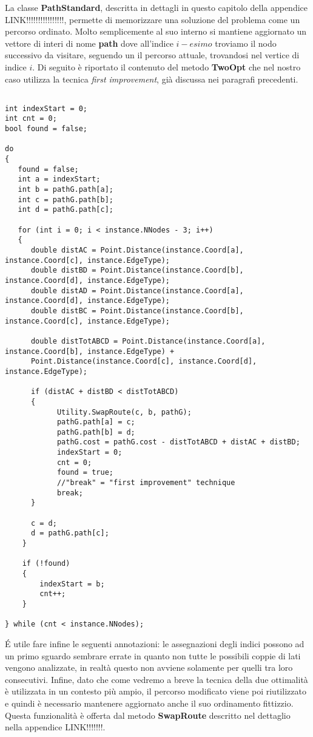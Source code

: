 \documentclass[11pt]{article}
\begin{document}
La classe \textbf{PathStandard}, descritta in dettagli in questo capitolo della appendice LINK!!!!!!!!!!!!!!!!, permette di memorizzare una soluzione del problema come un percorso ordinato. Molto semplicemente al suo interno si mantiene aggiornato un vettore di interi di nome \textbf{path} dove all'indice $i-esimo$ troviamo il nodo successivo da visitare, seguendo un il percorso attuale, trovandosi nel vertice di indice $i$.
Di seguito è riportato il contenuto del metodo \textbf{TwoOpt} che nel nostro caso utilizza la tecnica \textit{first improvement}, già discussa nei paragrafi precedenti.

\begin{lstlisting}

int indexStart = 0;
int cnt = 0;
bool found = false;

do
{
   found = false;
   int a = indexStart;
   int b = pathG.path[a];
   int c = pathG.path[b];
   int d = pathG.path[c];

   for (int i = 0; i < instance.NNodes - 3; i++)
   {
      double distAC = Point.Distance(instance.Coord[a], instance.Coord[c], instance.EdgeType);
      double distBD = Point.Distance(instance.Coord[b], instance.Coord[d], instance.EdgeType);
      double distAD = Point.Distance(instance.Coord[a], instance.Coord[d], instance.EdgeType);
      double distBC = Point.Distance(instance.Coord[b], instance.Coord[c], instance.EdgeType);

      double distTotABCD = Point.Distance(instance.Coord[a], instance.Coord[b], instance.EdgeType) +
      Point.Distance(instance.Coord[c], instance.Coord[d], instance.EdgeType);

      if (distAC + distBD < distTotABCD)
      {
            Utility.SwapRoute(c, b, pathG);
            pathG.path[a] = c;
            pathG.path[b] = d;
            pathG.cost = pathG.cost - distTotABCD + distAC + distBD;
            indexStart = 0;
            cnt = 0;
            found = true;
            //"break" = "first improvement" technique
            break;
      }
      
      c = d;
      d = pathG.path[c];
    }

    if (!found)
    {
        indexStart = b;
        cnt++;
    }

} while (cnt < instance.NNodes);

\end{lstlisting}

\'E utile fare infine le seguenti annotazioni: le assegnazioni degli indici possono ad un primo sguardo sembrare errate in quanto non tutte le possibili coppie di lati vengono analizzate, in realtà questo non avviene solamente per quelli tra loro consecutivi. Infine, dato che come vedremo a breve la tecnica della due ottimalità è utilizzata in un contesto più ampio, il percorso modificato viene poi riutilizzato e quindi è necessario mantenere aggiornato anche il suo ordinamento fittizzio. Questa funzionalità è offerta dal metodo \textbf{SwapRoute} descritto nel dettaglio nella appendice LINK!!!!!!!.
\end{document}

